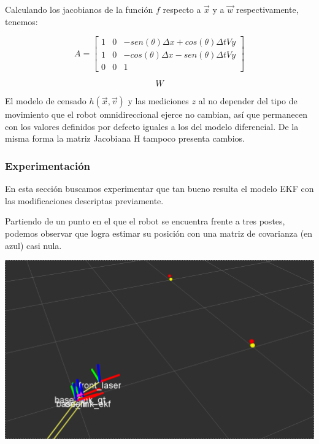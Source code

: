 Calculando los jacobianos de la función $f$ respecto a $\overrightarrow{x}$ y a $\overrightarrow{w}$ respectivamente, tenemos:

$$A= \begin{bmatrix}
         1 & 0 & -sen(\theta)\Delta x + cos(\theta) \Delta t V y\\
         1 & 0 & -cos(\theta)\Delta x - sen(\theta) \Delta t V y \\
         0 & 0 & 1
         \end{bmatrix}$$

$$W$$

El modelo de censado $h(\overrightarrow{x},\overrightarrow{v})$ y las mediciones $z$ al no depender del tipo de movimiento que el robot omnidireccional ejerce no cambian, así que permanecen con los valores definidos por defecto iguales a los del modelo diferencial. De la misma forma la matriz Jacobiana H tampoco presenta cambios.


\subsubsection{Experimentación}

En esta sección buscamos experimentar que tan bueno resulta el modelo EKF con las modificaciones descriptas previamente.

Partiendo de un punto en el que el robot se encuentra frente a tres postes, podemos observar que logra estimar su posición con una matriz de covarianza (en azul) casi nula.

\includegraphics[scale=0.3]{punto4/ekfViendoTodosLosPostes.png}

